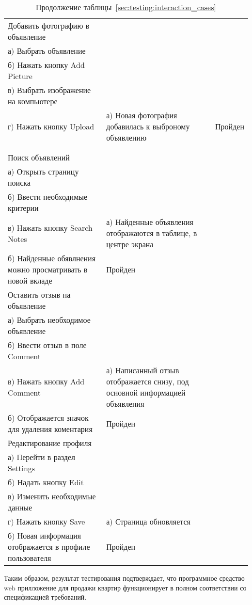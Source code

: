 \begin{longtable}[l]{| >{\raggedright}m{}
                  | >{\raggedright}m{}
                  | >{\raggedright\arraybackslash}m{}|}
   Добавить фотографию в объявление \\
   а) Выбрать объявление \\
   б) Нажать кнопку Add Picture \\
   в) Выбрать изображение на компьютере \\
   г) Нажать кнопку Upload
   &
   а) Новая фотография добавилась к выброному объявлению
   &
   Пройден \\
  \pagebreak
  \caption*{Продолжение таблицы~\ref{sec:testing:interaction_cases}} \\
   \hline
   \centering 1 & \centering 2 & \centering 3 \tabularnewline
   \hline
   Поиск объявлений \\
   а) Открыть страницу поиска \\
   б) Ввести необходимые критерии \\
   в) Нажать кнопку Search Notes
   &
   а) Найденные объявления отображаются в таблице, в центре экрана \\
   б) Найденные обявлнения можно просматривать в новой вкладе
   &
   Пройден \\
   \hline
   Оставить отзыв на объявление \\
   а) Выбрать необходимое объявление \\
   б) Ввести отзыв в поле Comment \\
   в) Нажать кнопку Add Comment
   &
   а) Написанный отзыв отображается снизу, под основной информацией объявления \\
   б) Отображается значок для удаления коментария
   &
   Пройден \\
   \hline
   
   Редактирование профиля \\
   а) Перейти в раздел Settings \\
   б) Надать кнопку Edit \\
   в) Изменить необходимые данные \\
   г) Нажать кнопку Save
   &
   а) Страница обновляется \\
   б) Новая информация отображается в профиле пользователя
   &
   Пройден \\
   \hline
\end{longtable}


Таким образом, результат тестирования подтверждает, что программное средство web прилложение для продажи квартир функционирует в полном соответствии со спецификацией требований.

